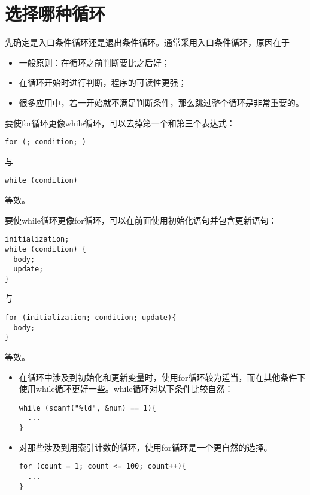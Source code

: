 \section{选择哪种循环}
\begin{frame}[fragile]\ft{\secname}
先确定是入口条件循环还是退出条件循环。通常采用入口条件循环，原因在于

\begin{itemize}
\item
一般原则：在循环之前判断要比之后好；\\[0.1in]
\item 
在循环开始时进行判断，程序的可读性更强；\\[0.1in]
\item
很多应用中，若一开始就不满足判断条件，那么跳过整个循环是非常重要的。
\end{itemize}
\end{frame}

\begin{frame}[fragile]\ft{\secname}
要使for循环更像while循环，可以去掉第一个和第三个表达式：
\begin{lstlisting}
for (; condition; )
\end{lstlisting}
与
\begin{lstlisting}
while (condition)
\end{lstlisting}
等效。
\end{frame}

\begin{frame}[fragile]\ft{\secname}
要使while循环更像for循环，可以在前面使用初始化语句并包含更新语句：
\begin{lstlisting}
initialization;
while (condition) {
  body;
  update;
}
\end{lstlisting}
与
\begin{lstlisting}
for (initialization; condition; update){
  body;
}
\end{lstlisting}
等效。
\end{frame}

\begin{frame}[fragile]\ft{\secname}
\begin{itemize}
\item 在循环中涉及到初始化和更新变量时，使用for循环较为适当，而在其他条件下使用while循环更好一些。while循环对以下条件比较自然：
\begin{lstlisting}
while (scanf("%ld", &num) == 1){
  ...
}
\end{lstlisting}

\item 对那些涉及到用索引计数的循环，使用for循环是一个更自然的选择。
\begin{lstlisting}
for (count = 1; count <= 100; count++){
  ...
}
\end{lstlisting}
\end{itemize}

\end{frame}
